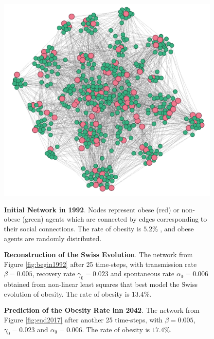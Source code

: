 \documentclass[11pt]{article}
\begin{document}
\begin{figure}[!htb]
\begin{minipage}{.3\linewidth}
\end{minipage}%
\hfill%
\begin{minipage}{.3\linewidth}
    \centering
    \includegraphics[width=\linewidth]{figures/end2042.png}
\end{minipage}%
\hfill%
\begin{minipage}[t]{.3\linewidth}
    \caption{\label{fig:begin1992} \textbf{Initial Network in 1992}. Nodes represent obese (red) or non-obese (green) agents which are connected by edges corresponding to their social connections. The rate of obesity is \(5.2\%\) \cite{bmistatistics}, and obese agents are randomly distributed.}
\end{minipage}%
\hfill%
\begin{minipage}[t]{.3\linewidth}
    \caption{\label{fig:end2017} \textbf{Reconstruction of the Swiss Evolution}. The network from Figure \ref{fig:begin1992} after 25 time-steps, with transmission rate $\beta = 0.005 $, recovery rate $\gamma_0 = 0.023$ and spontaneous rate $\alpha_0 = 0.006$ obtained from non-linear least squares that best model the Swiss evolution of obesity. The rate of obesity is \(13.4\%\).}
\end{minipage}%
\hfill%
\begin{minipage}[t]{.3\linewidth}
    \caption{\label{fig:end2042} \textbf{Prediction of the Obesity Rate inn 2042}. The network from Figure \ref{fig:end2017} after another 25 time-steps, with $\beta = 0.005 $, $\gamma_0 = 0.023$ and $\alpha_0 = 0.006$. The rate of obesity is \(17.4\%\).}
\end{minipage}%
\end{figure}
\end{document}
